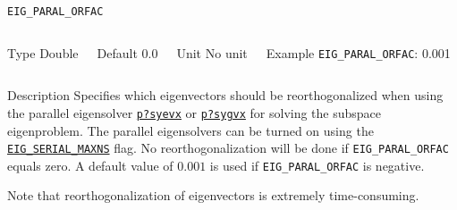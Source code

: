 \begin{frame}[allowframebreaks]{\texttt{EIG\_PARAL\_ORFAC}} \label{EIG_PARAL_ORFAC}
\vspace*{-12pt}
\begin{columns}
\begin{block}{Type}
Double
\end{block}

\begin{block}{Default}
0.0
\end{block}

\begin{block}{Unit}
No unit
\end{block}

\begin{block}{Example}
\texttt{EIG\_PARAL\_ORFAC}: 0.001
\end{block}
\end{columns}

\begin{block}{Description}
Specifies which eigenvectors should be reorthogonalized when using the parallel eigensolver 
\href{https://software.intel.com/content/www/us/en/develop/documentation/onemkl-developer-reference-c/top/scalapack-routines/scalapack-driver-routines/p-syevx.html}{\texttt{p?syevx}} 
or 
\href{https://software.intel.com/content/www/us/en/develop/documentation/onemkl-developer-reference-c/top/scalapack-routines/scalapack-driver-routines/p-sygvx.html}{\texttt{p?sygvx}} 
for solving the subspace eigenproblem. 
The parallel eigensolvers can be turned on using the \hyperlink{EIG_SERIAL_MAXNS}{\texttt{EIG\_SERIAL\_MAXNS}} flag.
No reorthogonalization will be done if \texttt{EIG\_PARAL\_ORFAC} equals zero. A default value of $0.001$ is used if \texttt{EIG\_PARAL\_ORFAC} is negative. 

Note that reorthogonalization of eigenvectors is extremely time-consuming.
\end{block}

\end{frame}


